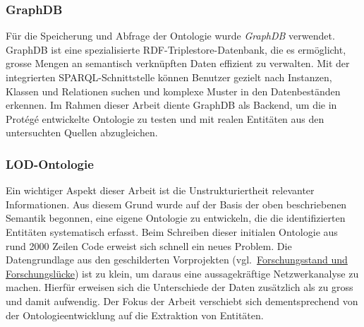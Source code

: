 \documentclass[12pt, a4paper, ngerman, bidi=default]{article}
\begin{document}
\subsubsection{GraphDB} Für die Speicherung und Abfrage der Ontologie wurde \textit{GraphDB} verwendet. 
GraphDB ist eine spezialisierte RDF-Triplestore-Datenbank, die es ermöglicht, 
grosse Mengen an semantisch verknüpften Daten effizient zu verwalten. 
Mit der integrierten SPARQL-Schnittstelle können Benutzer gezielt nach Instanzen, Klassen und Relationen suchen 
und komplexe Muster in den Datenbeständen erkennen. 
Im Rahmen dieser Arbeit diente GraphDB als Backend, um die in Protégé entwickelte Ontologie zu testen 
und mit realen Entitäten aus den untersuchten Quellen abzugleichen.



\noindent
\begin{minipage}[t]{0.52\textwidth}
  \justifying%
\subsubsection{LOD-Ontologie}
Ein wichtiger Aspekt dieser Arbeit ist die Unstrukturiertheit relevanter Informationen. 
Aus diesem Grund wurde auf der Basis der oben beschriebenen Semantik begonnen, eine eigene Ontologie zu entwickeln, die die identifizierten Entitäten systematisch erfasst.
Beim Schreiben dieser initialen Ontologie aus rund 2000 Zeilen Code erweist sich schnell ein neues Problem. Die Datengrundlage aus den geschilderten Vorprojekten (vgl.~\hyperref[subsec:forschungsstand]{Forschungsstand und Forschungslücke}) ist 
zu klein, um daraus eine aussagekräftige Netzwerkanalyse zu machen. Hierfür erweisen sich die Unterschiede der Daten zusätzlich als zu gross und damit aufwendig. Der Fokus der Arbeit verschiebt sich dementsprechend von der Ontologieentwicklung auf die Extraktion von Entitäten.
\end{minipage}%
\hfill%
\end{document}
